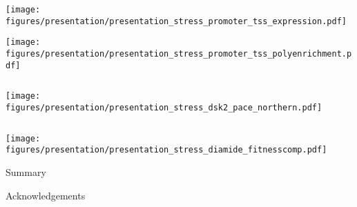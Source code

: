 \documentclass[aspectratio=169, 12pt]{beamer}
\begin{document}
\begin{frame}[t]
    \texttt{[image: figures/presentation/presentation\_stress\_promoter\_tss\_expression.pdf]}
\end{frame}

\begin{frame}[t]
    \texttt{[image: figures/presentation/presentation\_stress\_promoter\_tss\_polyenrichment.pdf]}
\end{frame}

\begin{frame}[t,plain]
    \begin{adjustbox}{center}
    \end{adjustbox}
\end{frame}

\begin{frame}
    \begin{columns}
        \begin{column}{0.5\textwidth}
            \texttt{[image: figures/presentation/presentation\_stress\_dsk2\_pace\_northern.pdf]}
        \end{column}
        \begin{column}{0.5\textwidth}
        \end{column}
    \end{columns}
\end{frame}

\begin{frame}
    \texttt{[image: figures/presentation/presentation\_stress\_diamide\_fitnesscomp.pdf]}
\end{frame}

\begin{frame}{Summary}
\end{frame}

\begin{frame}{Acknowledgements}
\end{frame}
\end{document}
